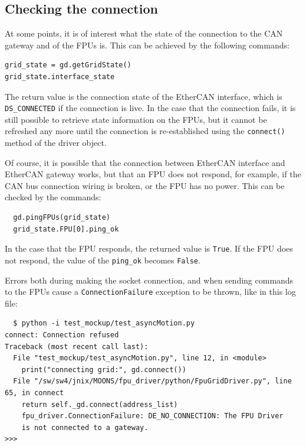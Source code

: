 \documentclass[11pt,a4paper]{scrartcl}
\begin{document}
\subsection{Checking the connection}
\begin{samepage}
At some points, it is of interest what the state of
the connection to the CAN gateway and of the FPUs is.
This can be achieved by the following commands:
\begin{verbatim}
grid_state = gd.getGridState()
grid_state.interface_state  
\end{verbatim}
The return value is the connection state of the EtherCAN interface, which is
\texttt{DS\_CONNECTED} if the connection is live.  In the case that the
connection fails, it is still possible to retrieve state information
on the FPUs, but it cannot be refreshed any more until the connection
is re-established using the \texttt{connect()} method of the driver
object.
\end{samepage}

 Of course, it is possible that the
connection between EtherCAN interface and EtherCAN gateway works, but that an FPU
does not respond, for example, if the CAN bus connection wiring is
broken, or the FPU has no power. This can be checked by the commands:

\begin{verbatim}
  gd.pingFPUs(grid_state)
  grid_state.FPU[0].ping_ok
\end{verbatim}

In the case that the FPU responds, the returned value is
\texttt{True}.  If the FPU does not respond, the value of the
\verb+ping_ok+ becomes \texttt{False}.

Errors both during making the socket connection, and when sending
commands to the FPUs cause a \texttt{ConnectionFailure} exception to
be thrown, like in this log file:

\begin{verbatim}
  $ python -i test_mockup/test_asyncMotion.py 
connect: Connection refused
Traceback (most recent call last):
  File "test_mockup/test_asyncMotion.py", line 12, in <module>
    print("connecting grid:", gd.connect())
  File "/sw/sw4/jnix/MOONS/fpu_driver/python/FpuGridDriver.py", line 65, in connect
    return self._gd.connect(address_list)
    fpu_driver.ConnectionFailure: DE_NO_CONNECTION: The FPU Driver
    is not connected to a gateway.
>>> 
\end{verbatim}
\end{document}
